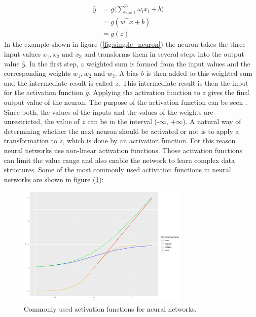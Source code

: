 \begin{equation} \label{eq:simple_neuron}
\begin{split}
	\hat{y}		& = g\bigg( \sum_{i=1}^{3} \omega_i x_i + b \bigg) \\
				& = g(w^\top x + b) \\
				& = g(z)
\end{split}
\end{equation}
In the example shown in figure (\ref{fig:simple_neuron}) the neuron takes the three input values $x_1, x_2 \text{ and } x_3$ and transforms them in several steps into the output value $\hat{y}$. In the first step, a weighted sum is formed from the input values and the corresponding weights $w_1, w_2 \text{ and } w_3$. A bias $b$ is then added to this weighted sum and the intermediate result is called $z$. This intermediate result is then the input for the activation function $g$. Applying the activation function to $z$ gives the final output value of the neuron. The purpose of the activation function can be seen 
. Since both, the values of the inputs and the values of the weights are unrestricted, the value of $z$ can be in the interval (-$\infty$, $+\infty$). A natural way of determining whether the next neuron should be activated or not is to apply a transformation to $z$, which is done by an activation function. For this reason neural networks use non-linear activation functions. Those activation functions can limit the value range and also enable the network to learn complex data structures. Some of the most commonly used activation functions in neural networks are shown in figure (\ref{fig:activation_func}): 

\begin{figure}
	\centering
	\includegraphics[width=0.75\textwidth]{figures/chapter_NN/activation_functions}
	\caption{Commonly used activation functions for neural networks.}
	\label{fig:activation_func}
\end{figure}


